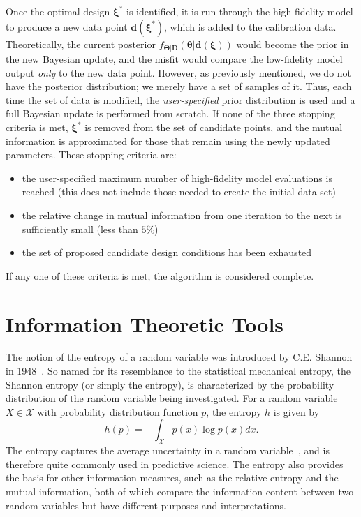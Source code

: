 Once the optimal design $\boldsymbol{\xi}^{*}$ is identified, it is run 
through the high-fidelity model to produce a new data point $\boldsymbol{d}(
\boldsymbol{\xi}^{*})$, which is added to the calibration data. Theoretically,
the current posterior $f_{\boldsymbol{\Theta | D}}\left(\boldsymbol{\theta | 
d(\xi)}\right)$ would become the prior in the new Bayesian update, and the 
misfit would compare the low-fidelity model output \textit{only} to the new
data point. However, as previously mentioned, we do not have the posterior
distribution; we merely have a set of samples of it. Thus, each time the set
of data is modified, the \textit{user-specified} prior distribution is used
and a full Bayesian update is performed from scratch. If none of the three
stopping criteria is met, $\boldsymbol{\xi}^{*}$ is removed from the set of
candidate points, and the mutual information is approximated for those that
remain using the newly updated parameters. These stopping criteria are:
\begin{itemize}
\item the user-specified maximum number of high-fidelity model evaluations is 
reached (this does not include those needed to create the initial 
data set)
\item the relative change in mutual information from one iteration to the next
is sufficiently small (less than $5\%$)
\item the set of proposed candidate design conditions has been exhausted
\end{itemize}
If any one of these criteria is met, the algorithm is considered complete.

\section{Information Theoretic Tools}

The notion of the entropy of a random variable was introduced by C.E. 
Shannon in 1948~\cite{Sha1948}. So named for its resemblance to the statistical 
mechanical entropy, the Shannon entropy (or simply the entropy), is 
characterized by the probability distribution of the random variable being 
investigated. For a random variable $X \in \mathcal{X}$ with probability 
distribution function $p$, the entropy $h$ is given by
\begin{equation}
h(p) = -\int_{\mathcal{X}} p(x) \log p(x) dx.
\label{ent_cont}
\end{equation}
The entropy captures the average uncertainty in a random 
variable~\cite{Cov2006}, and is therefore quite commonly used in predictive 
science. The entropy also provides the basis for other information measures, 
such as the relative entropy and the mutual information, both of which compare 
the information content between two random variables but have different 
purposes and interpretations. 

